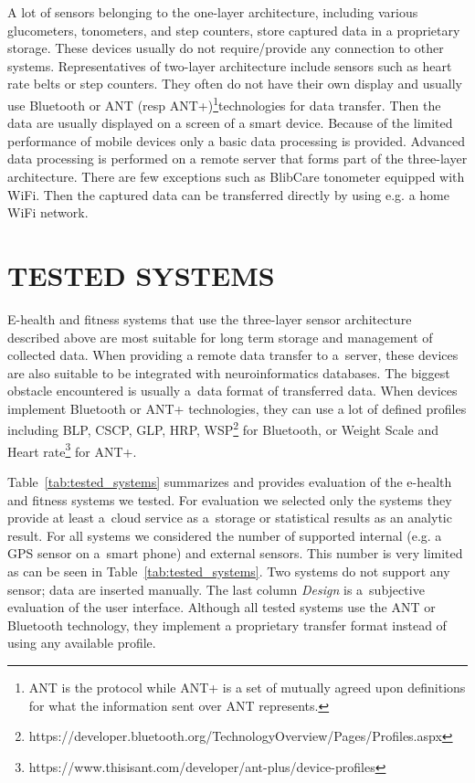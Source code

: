 \documentclass[a4paper,twoside]{article}
\begin{document}
 A lot of sensors belonging to the one-layer architecture, including various glucometers, tonometers, and step counters, store captured data in a proprietary storage. These devices usually do not require/provide any connection to other systems. Representatives of two-layer architecture include sensors such as heart rate belts or  step counters. They often do not have their own display and usually use Bluetooth or ANT (resp ANT+)\footnote{ANT is the protocol while ANT+ is a set of mutually agreed upon definitions for what the information sent over ANT represents.}technologies  for data transfer. Then the data are usually displayed on a screen of a smart device. Because of the limited performance of mobile devices only a basic data processing is provided. Advanced data processing is performed on a remote server that forms part of the three-layer architecture. There are few exceptions such as BlibCare tonometer equipped with WiFi. Then the captured data can be transferred directly by using e.g. a home WiFi network.


\section{\uppercase{Tested systems}}
\label{tested_systems}
\noindent

E-health and fitness systems that use the three-layer sensor architecture described above are most suitable for long term storage and management of collected data. When providing a remote data transfer to a~server, these devices are also suitable to be integrated with neuroinformatics databases. The biggest obstacle encountered is usually a~data format of transferred data. When devices implement Bluetooth or ANT+ technologies, they can use a lot of defined profiles including BLP, CSCP, GLP, HRP, WSP\footnote{https://developer.bluetooth.org/TechnologyOverview/Pages/Profiles.aspx} for Bluetooth, or Weight Scale and Heart rate\footnote{https://www.thisisant.com/developer/ant-plus/device-profiles} for ANT+.

Table~\ref{tab:tested_systems} summarizes and provides evaluation of the e-health and fitness systems we tested. For evaluation we selected only the systems they provide at least a~cloud service as a~storage or statistical results as an analytic result. For all systems we considered the number of supported internal (e.g. a GPS sensor on a~smart phone) and external sensors. This number is very limited as can be seen in Table~\ref{tab:tested_systems}. Two systems do not support any sensor; data are inserted manually. The last column \emph{Design} is a~subjective evaluation of the user interface. Although all tested systems use the ANT or Bluetooth technology, they implement a proprietary transfer format instead of using any available profile.
\end{document}
